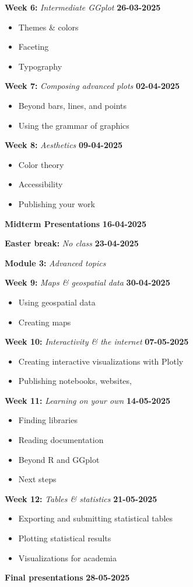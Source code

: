 \documentclass{article}
\newcommand{\week}[3]{
    \begin{center}
        \textbf{#1:} \textit{#2} \dotfill \textbf{#3}
    \end{center}
}
\newcommand{\specialweek}[2]{
    \begin{center}
        \textbf{#1} \dotfill \textbf{#2}
    \end{center}
}
\newcommand{\module}[2]{
    \vspace{2em}
    \large
    \textbf{#1:} \textit{#2}
    \normalsize
}
\begin{document}
\week{Week 6}{Intermediate GGplot}{26-03-2025}
\begin{itemize}
    \item Themes \& colors
    \item Faceting
    \item Typography
\end{itemize}

\week{Week 7}{Composing advanced plots}{02-04-2025}
\begin{itemize}
    \item Beyond bars, lines, and points
    \item Using the grammar of graphics
\end{itemize}

\week{Week 8}{Aesthetics}{09-04-2025}
\begin{itemize}
    \item Color theory
    \item Accessibility
    \item Publishing your work
\end{itemize}

\specialweek{Midterm Presentations}{16-04-2025}
\week{Easter break}{No class}{23-04-2025}

\module{Module 3}{Advanced topics}

\week{Week 9}{Maps \& geospatial data}{30-04-2025}
\begin{itemize}
    \item Using geospatial data
    \item Creating maps
\end{itemize}

\week{Week 10}{Interactivity \& the internet}{07-05-2025}
\begin{itemize}
    \item Creating interactive visualizations with Plotly
    \item Publishing notebooks, websites, 
\end{itemize}

\week{Week 11}{Learning on your own}{14-05-2025}
\begin{itemize}
    \item Finding libraries
    \item Reading documentation
    \item Beyond R and GGplot 
    \item Next steps
\end{itemize}

\week{Week 12}{Tables \& statistics}{21-05-2025}
\begin{itemize}
    \item Exporting and submitting statistical tables
    \item Plotting statistical results
    \item Visualizations for academia
\end{itemize}

\specialweek{Final presentations}{28-05-2025}
\end{document}
